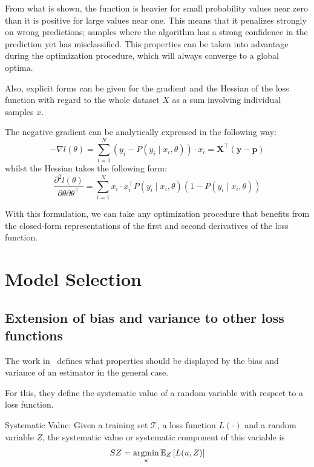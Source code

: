 From what is shown, the function is heavier for small probability values near zero than it is positive for large values near one.
This means that it penalizes strongly on wrong predictions; samples where the algorithm has a strong confidence in the prediction yet has misclassified.
This properties can be taken into advantage during the optimization procedure, which will always converge to a global optima.

Also, explicit forms can be given for the gradient and the Hessian of the loss function with regard to the whole dataset $X$ as a sum involving individual samples $x$.

The negative gradient can be analytically expressed in the following way: %
\begin{equation}
- \nabla l(\theta) = \sum_{i=1}^N (y_i - P(y_i \mid x_i,\theta))\cdot x_i = \textbf{X}^{\intercal}(\textbf{y}-\textbf{p})
\label{eq:logitHessian1}
\end{equation}
whilst the Hessian takes the following form:
\begin{equation}
\frac{\partial^2 l(\theta)}{\partial \theta \partial \theta^\intercal} = \sum_{i=1}^N x_i \cdot x_i^\intercal P(y_i \mid x_i,\theta)(1 -P(y_i \mid x_i,\theta))
\label{eq:logitHessian2}
\end{equation}

With this formulation, we can take any optimization procedure that benefits from the closed-form representations of the first and second derivatives of the loss function.



\chapter{Model Selection}

\section{Extension of bias and variance to other loss functions}\label{appx:sec:biasVarianceExtensionLoss}

The work in~\cite{james-biasVarianceGeneral} defines what properties should be displayed by the bias and variance of an estimator in the general case.

For this, they define the systematic value of a random variable with respect to a loss function.


\begin{definition}{Systematic Value:}
Given a training set $\mathcal{T}$, a loss function $L(\cdot)$ and a random variable $Z$, the systematic value or systematic component of this variable is
$$ SZ =  \operatorname*{argmin}_u \operatorname{\mathbb{E}}_{Z} \left[ L(u,Z) \right]$$
\end{definition}

